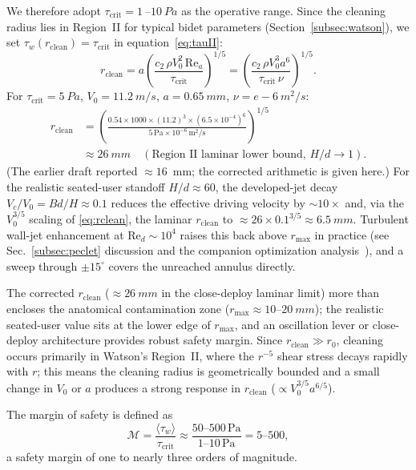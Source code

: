 \documentclass[10pt,letterpaper]{article}
\newcommand{\Rey}{\mathrm{Re}}
\begin{document}
We therefore adopt $\tau_\mathrm{crit} = 1~$--$10~Pa$ as
the operative range. Since the cleaning radius lies in Region~II for
typical bidet parameters (Section~\ref{subsec:watson}), we set
$\tau_w(r_\mathrm{clean}) = \tau_\mathrm{crit}$ in
equation~\eqref{eq:tauII}:
\begin{equation}
    r_\mathrm{clean} = a\left(\frac{c_2\,\rho V_0^2\,\Rey_a}{\tau_\mathrm{crit}}\right)^{1/5}
    = \left(\frac{c_2\,\rho V_0^3 a^6}{\tau_\mathrm{crit}\,\nu}\right)^{1/5}.
    \label{eq:rclean}
\end{equation}
For $\tau_\mathrm{crit} = 5~Pa$, $V_0 = 11.2~m/s$,
$a = 0.65~mm$, $\nu = e-6~m^2/s$:
\begin{align}
    r_\mathrm{clean} &= \left(\frac{0.54 \times 1000 \times (11.2)^3
    \times (6.5\times 10^{-4})^6}{5\,\mathrm{Pa}\times 10^{-6}\,\mathrm{m^2/s}}\right)^{1/5}
    \nonumber\\
    &\approx 26~mm\quad
    (\text{Region~II laminar lower bound, $H/d \to 1$}).
    \label{eq:rcleanval}
\end{align}
(The earlier draft reported $\approx 16$~mm; the corrected arithmetic
is given here.) For the realistic seated-user standoff $H/d \approx 60$,
the developed-jet decay $V_c/V_0 = B d/H \approx 0.1$ reduces the
effective driving velocity by $\sim 10\times$ and, via the
$V_0^{3/5}$ scaling of \eqref{eq:rclean}, the laminar
$r_\mathrm{clean}$ to $\approx 26 \times 0.1^{3/5} \approx 6.5~mm$.
Turbulent wall-jet enhancement at $\Rey_d \sim 10^4$ raises this back
above $r_\mathrm{max}$ in practice (see Sec.~\ref{subsec:peclet}
discussion and the companion optimization
analysis~\citep{BurtonOptPaper}), and a sweep through $\pm 15^\circ$
covers the unreached annulus directly.

The corrected $r_\mathrm{clean}$ ($\approx 26~mm$ in the
close-deploy laminar limit) more than encloses the anatomical
contamination zone ($r_\mathrm{max} \approx 10$--$20~mm$); the
realistic seated-user value sits at the lower edge of $r_\mathrm{max}$,
and an oscillation lever or close-deploy architecture provides
robust safety margin. Since $r_\mathrm{clean} \gg r_0$, cleaning
occurs primarily in Watson's Region~II, where the $r^{-5}$ shear stress
decays rapidly with $r$; this means the cleaning radius is geometrically
bounded and a small change in $V_0$ or $a$ produces a strong response in
$r_\mathrm{clean}$ ($\propto V_0^{3/5} a^{6/5}$).

The margin of safety is defined as
\begin{equation}
    \mathcal{M} = \frac{\langle\tau_w\rangle}{\tau_\mathrm{crit}} \approx
    \frac{50\text{--}500\,\mathrm{Pa}}{1\text{--}10\,\mathrm{Pa}} = 5\text{--}500,
    \label{eq:margin}
\end{equation}
a safety margin of one to nearly three orders of magnitude.
\end{document}
